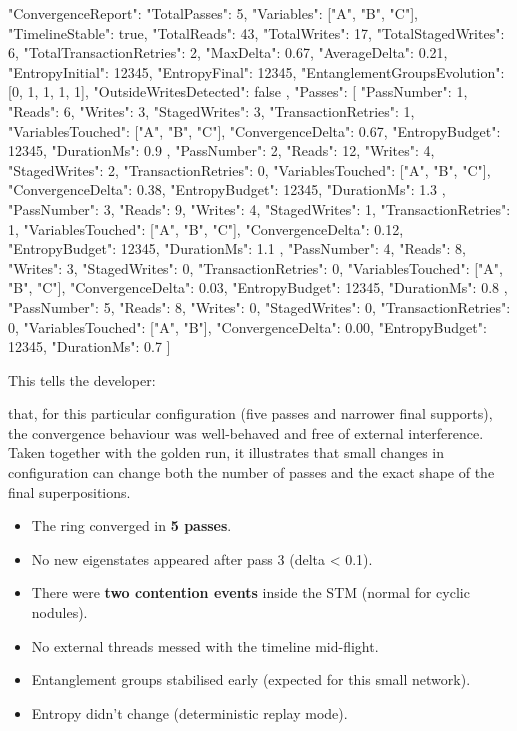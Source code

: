 \documentclass[a4paper,11pt]{article}
\begin{document}
\begin{datadumpnofloat}
{
  "ConvergenceReport": {
    "TotalPasses": 5,
    "Variables": ["A", "B", "C"],
    "TimelineStable": true,
    "TotalReads": 43,
    "TotalWrites": 17,
    "TotalStagedWrites": 6,
    "TotalTransactionRetries": 2,
    "MaxDelta": 0.67,
    "AverageDelta": 0.21,
    "EntropyInitial": 12345,
    "EntropyFinal": 12345,
    "EntanglementGroupsEvolution": [0, 1, 1, 1, 1],
    "OutsideWritesDetected": false
  },
  "Passes": [
    {
      "PassNumber": 1,
      "Reads": 6,
      "Writes": 3,
      "StagedWrites": 3,
      "TransactionRetries": 1,
      "VariablesTouched": ["A", "B", "C"],
      "ConvergenceDelta": 0.67,
      "EntropyBudget": 12345,
      "DurationMs": 0.9
    },
    {
      "PassNumber": 2,
      "Reads": 12,
      "Writes": 4,
      "StagedWrites": 2,
      "TransactionRetries": 0,
      "VariablesTouched": ["A", "B", "C"],
      "ConvergenceDelta": 0.38,
      "EntropyBudget": 12345,
      "DurationMs": 1.3
    },
    {
      "PassNumber": 3,
      "Reads": 9,
      "Writes": 4,
      "StagedWrites": 1,
      "TransactionRetries": 1,
      "VariablesTouched": ["A", "B", "C"],
      "ConvergenceDelta": 0.12,
      "EntropyBudget": 12345,
      "DurationMs": 1.1
    },
    {
      "PassNumber": 4,
      "Reads": 8,
      "Writes": 3,
      "StagedWrites": 0,
      "TransactionRetries": 0,
      "VariablesTouched": ["A", "B", "C"],
      "ConvergenceDelta": 0.03,
      "EntropyBudget": 12345,
      "DurationMs": 0.8
    },
    {
      "PassNumber": 5,
      "Reads": 8,
      "Writes": 0,
      "StagedWrites": 0,
      "TransactionRetries": 0,
      "VariablesTouched": ["A", "B"],
      "ConvergenceDelta": 0.00,
      "EntropyBudget": 12345,
      "DurationMs": 0.7
    }
  ]
}
\end{datadumpnofloat}

This tells the developer:

that, for this particular configuration (five passes and narrower final supports),
the convergence behaviour was well-behaved and free of external interference. Taken
together with the golden run, it illustrates that small changes in configuration can
change both the number of passes and the exact shape of the final superpositions.

\begin{itemize}
\item
  The ring converged in \textbf{5 passes}.
\item
  No new eigenstates appeared after pass 3 (delta \textless{} 0.1).
\item
  There were \textbf{two contention events} inside the STM (normal for cyclic nodules).
\item
  No external threads messed with the timeline mid-flight.
\item
  Entanglement groups stabilised early (expected for this small network).
\item
  Entropy didn't change (deterministic replay mode).
\end{itemize}
\end{document}
